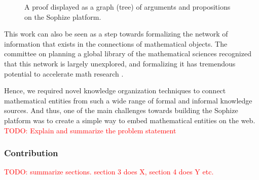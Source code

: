 \documentclass[a4paper]{article}
\newcommand\todo[1]{\textcolor{red}{TODO: #1}}
\begin{document}
\begin{figure}[htbp]
\begin{center}
\caption{A proof displayed as a graph (tree) of arguments and propositions on the Sophize platform.}
\label{proof_tree}
\end{center}
\end{figure}

This work can also be seen as a step towards formalizing the network of information that exists in the connections of mathematical objects. The committee on planning a global library of the mathematical sciences recognized that this network is largely unexplored, and formalizing it has tremendous potential to accelerate math research \cite{sciences2014developing}.

Hence, we required novel knowledge organization techniques to connect mathematical entities from such a wide range of formal and informal knowledge sources. And thus, one of the main challenges towards building the Sophize platform was to create a simple way to embed mathematical entities on the web. \todo{Explain and summarize the problem statement}


\subsubsection*{Contribution}
\todo{summarize sections. section 3 does X, section 4 does Y etc.}
\end{document}

